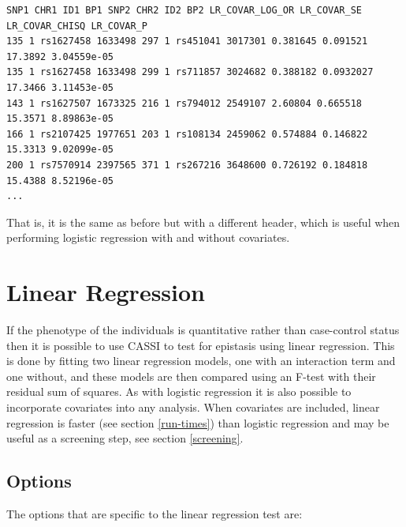 \documentclass[a4paper,12pt]{article}
\begin{document}
\vspace{0.35cm} \begin{lstlisting}
SNP1 CHR1 ID1 BP1 SNP2 CHR2 ID2 BP2 LR_COVAR_LOG_OR LR_COVAR_SE LR_COVAR_CHISQ LR_COVAR_P
135 1 rs1627458 1633498 297 1 rs451041 3017301 0.381645 0.091521 17.3892 3.04559e-05
135 1 rs1627458 1633498 299 1 rs711857 3024682 0.388182 0.0932027 17.3466 3.11453e-05
143 1 rs1627507 1673325 216 1 rs794012 2549107 2.60804 0.665518 15.3571 8.89863e-05
166 1 rs2107425 1977651 203 1 rs108134 2459062 0.574884 0.146822 15.3313 9.02099e-05
200 1 rs7570914 2397565 371 1 rs267216 3648600 0.726192 0.184818 15.4388 8.52196e-05
...

\end{lstlisting} \vspace{0.35cm}
That is, it is the same as before but with a different header, which is useful when performing logistic regression with and without covariates. 




\section{Linear Regression}
\label{linear-regression}

If the phenotype of the individuals is quantitative rather than case-control status then it is possible to use CASSI to test for epistasis using linear regression. This is done by fitting two linear regression models, one with an interaction term and one without, and these models are then compared using an F-test with their residual sum of squares. As with logistic regression it is also possible to incorporate covariates into any analysis. When covariates are included, linear regression is faster (see  section \ref{run-times}) than logistic regression and may be useful as a screening step, see  section \ref{screening}. 
\subsection{Options}
\label{lin-options}

The options that are specific to the linear regression test are: 
\end{document}
